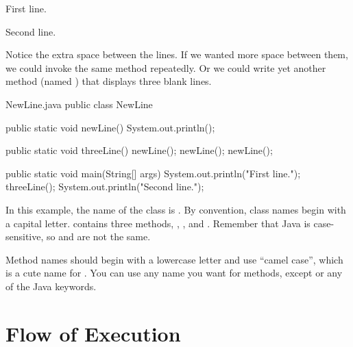 \begin{stdout}
First line.

Second line.
\end{stdout}

Notice the extra space between the lines.
If we wanted more space between them, we could invoke the same method repeatedly.
Or we could write yet another method (named ) that displays three blank lines.


\begin{trinket}{NewLine.java}
public class NewLine {

    public static void newLine() {
        System.out.println();
    }

    public static void threeLine() {
        newLine();
        newLine();
        newLine();
    }

    public static void main(String[] args) {
        System.out.println("First line.");
        threeLine();
        System.out.println("Second line.");
    }
}
\end{trinket}


In this example, the name of the class is .
By convention, class names begin with a capital letter.
 contains three methods, , , and .
Remember that Java is case-sensitive, so  and  are not the same.


Method names should begin with a lowercase letter and use ``camel case'', which is a cute name for .
You can use any name you want for methods, except  or any of the Java keywords.



\section{Flow of Execution}

